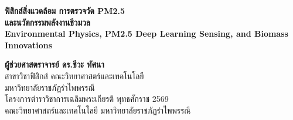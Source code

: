 \begin{titlepage}
\begin{center}
    \vspace*{1.5cm}
    
    {\Huge\bfseries\color{carbonNavy} ฟิสิกส์สิ่งแวดล้อม การตรวจวัด PM2.5}\\[0.5cm]
    {\LARGE\bfseries\color{flameAmber} และนวัตกรรมพลังงานชีวมวล}\\[0.6cm]
    {\large\sffamily\bfseries\color{skyBlue} Environmental Physics, PM2.5 Deep Learning Sensing, and Biomass Innovations}\\[2.0cm]
    
    \begin{figure}[H]
    \centering
    \end{figure}
    
    \vspace{2.0cm}
    
    {\Large\bfseries\color{carbonNavy} ผู้ช่วยศาสตราจารย์ ดร.ชีวะ ทัศนา}\\[0.3cm]
    {\normalsize สาขาวิชาฟิสิกส์ คณะวิทยาศาสตร์และเทคโนโลยี}\\[0.2cm]
    {\normalsize มหาวิทยาลัยราชภัฏรำไพพรรณี}\\[2.0cm]
    
    {\normalsize โครงการตำราวิชาการเฉลิมพระเกียรติ พุทธศักราช 2569}\\[0.2cm]
    {\small คณะวิทยาศาสตร์และเทคโนโลยี มหาวิทยาลัยราชภัฏรำไพพรรณี}
\end{center}
\end{titlepage}
